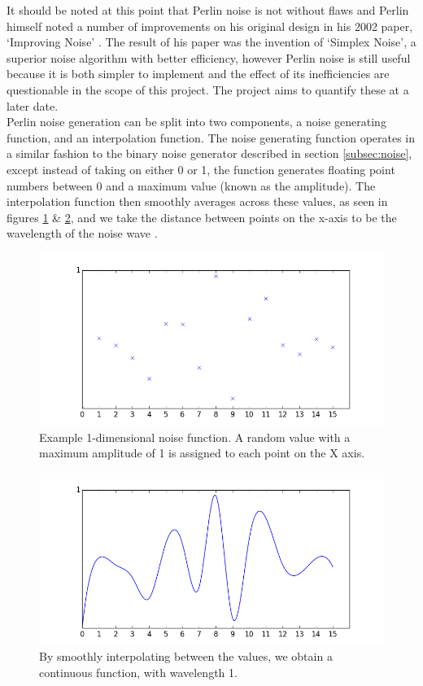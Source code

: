 \documentclass[12pt,a4paper]{article}
\begin{document}
It should be noted at this point that Perlin noise is not without flaws and Perlin himself noted a number of improvements on his original design in his 2002 paper, `Improving Noise' \cite{improvepnoise}. The result of his paper was the invention of `Simplex Noise', a superior noise algorithm with better efficiency, however Perlin noise is still useful because it is both simpler to implement and the effect of its inefficiencies are questionable in the scope of this project. The project aims to quantify these at a later date. \\

Perlin noise generation can be split into two components, a noise generating function, and an interpolation function. The noise generating function operates in a similar fashion to the binary noise generator described in section \ref{subsec:noise}, except instead of taking on either 0 or 1, the function generates floating point numbers between 0 and a maximum value (known as the amplitude). The interpolation function then smoothly averages across these values, as seen in figures \ref{fig:fig4} \& \ref{fig:fig5}, and we take the distance between points on the x-axis to be the wavelength of the noise wave \cite{Howuseperlin}. 


\begin{figure}[h]
  \centering
 	\includegraphics[scale=0.5]{images/figure2.png}
	\caption[]{Example 1-dimensional noise function. A random value with a maximum amplitude of 1 is assigned to each point on the X axis.}
	\label{fig:fig4}
\end{figure}

\begin{figure}
  \centering
 	\includegraphics[scale=0.5]{images/figure1.png}
	\caption[]{By smoothly interpolating between the values, we obtain a continuous function, with wavelength 1.}
	\label{fig:fig5}
\end{figure}
\end{document}

